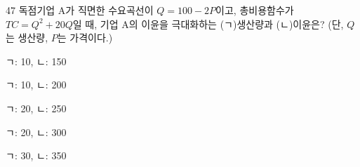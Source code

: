 \begin{question}{47}
독점기업 A가 직면한 수요곡선이 $Q = 100 - 2P$이고, 총비용함수가 $TC = Q^2 + 20Q$일 때, 기업 A의 이윤을 극대화하는 (ㄱ)생산량과 (ㄴ)이윤은? (단, $Q$는 생산량, $P$는 가격이다.)
\begin{choices}
  \item ㄱ: 10, ㄴ: 150
  \item ㄱ: 10, ㄴ: 200
  \item ㄱ: 20, ㄴ: 250
  \item ㄱ: 20, ㄴ: 300
  \item ㄱ: 30, ㄴ: 350
\end{choices}
\end{question}
